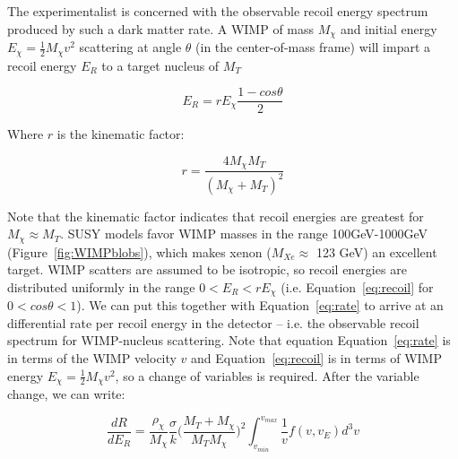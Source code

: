 

The experimentalist is concerned with the observable recoil energy spectrum produced by such a dark matter rate. A \ac{WIMP} of mass $M_{\chi}$ and initial energy $E_{\chi} = \frac{1}{2}M_{\chi}v^{2}$ scattering at angle $\theta$ (in the center-of-mass frame) will impart a recoil energy $E_{R}$ to a target nucleus of $M_{T}$

\begin{equation}
\label{eq:recoil}
E_{R} = r E_{\chi} \frac{1 - cos\theta}{2}
\end{equation}

Where $r$ is the kinematic factor:

\begin{equation}
r = \frac{ 4 M_{\chi}M_{T} }{ (M_{\chi} + M_{T})^{2}}
\end{equation}

Note that the kinematic factor indicates that recoil energies are greatest for $M_{\chi} \approx M_{T}$. SUSY models favor \ac{WIMP} masses in the range 100GeV-1000GeV (Figure~\ref{fig:WIMPblobs}), which makes xenon ($M_{Xe} \approx$ 123 GeV) an excellent target. \ac{WIMP} scatters are assumed to be isotropic, so recoil energies are distributed uniformly in the range $0 < E_{R} < rE_{\chi}$ (i.e. Equation~\ref{eq:recoil} for $0 < cos\theta < 1$). We can put this together with Equation~\ref{eq:rate} to arrive at an differential rate per recoil energy in the detector -- i.e. the observable recoil spectrum for \ac{WIMP}-nucleus scattering. Note that equation Equation~\ref{eq:rate} is in terms of the \ac{WIMP} velocity $v$ and Equation~\ref{eq:recoil} is in terms of \ac{WIMP} energy $E_{\chi} = \frac{1}{2}M_{\chi}v^{2}$, so a change of variables is required. After the variable change, we can write:

\begin{equation}
\label{ref:dRdEr}
\frac{dR}{dE_{R}} =  \frac{\rho_{\chi}}{M_{\chi}} \frac{\sigma}{k} \Big( \frac{ M_{T} + M_{\chi}}{M_{T} M_{\chi}} \Big)^{2} \int_{v_{min}}^{v_{max}} \frac{1}{v} f(v,v_{E}) d^{3}v
\end{equation}

